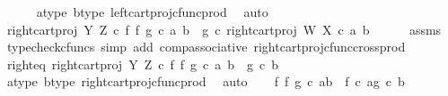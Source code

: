 \begin{isabellebody}
\ \ \ \ \isamarkupfalse%
\ a{\isacharunderscore}{\kern0pt}type\ b{\isacharunderscore}{\kern0pt}type\ left{\isacharunderscore}{\kern0pt}cart{\isacharunderscore}{\kern0pt}proj{\isacharunderscore}{\kern0pt}cfunc{\isacharunderscore}{\kern0pt}prod\ \isamarkupfalse%
\ auto\isanewline
\ \ \isanewline
\ \ \isamarkupfalse%
\ {\isachardoublequoteopen}right{\isacharunderscore}{\kern0pt}cart{\isacharunderscore}{\kern0pt}proj\ Y\ Z\ {\isasymcirc}\isactrlsub c\ {\isacharparenleft}{\kern0pt}f\ {\isasymtimes}\isactrlsub f\ g{\isacharparenright}{\kern0pt}\ {\isasymcirc}\isactrlsub c\ {\isasymlangle}a{\isacharcomma}{\kern0pt}\ b{\isasymrangle}\ {\isacharequal}{\kern0pt}\ g\ {\isasymcirc}\isactrlsub c\ right{\isacharunderscore}{\kern0pt}cart{\isacharunderscore}{\kern0pt}proj\ W\ X\ {\isasymcirc}\isactrlsub c\ {\isasymlangle}a{\isacharcomma}{\kern0pt}\ b{\isasymrangle}{\isachardoublequoteclose}\isanewline
\ \ \ \ \isamarkupfalse%
\ assms\ \isamarkupfalse%
\ {\isacharparenleft}{\kern0pt}typecheck{\isacharunderscore}{\kern0pt}cfuncs{\isacharcomma}{\kern0pt}\ simp\ add{\isacharcolon}{\kern0pt}\ comp{\isacharunderscore}{\kern0pt}associative{}\ right{\isacharunderscore}{\kern0pt}cart{\isacharunderscore}{\kern0pt}proj{\isacharunderscore}{\kern0pt}cfunc{\isacharunderscore}{\kern0pt}cross{\isacharunderscore}{\kern0pt}prod{\isacharparenright}{\kern0pt}\isanewline
\ \ \isamarkupfalse%
\ \isamarkupfalse%
\ right{\isacharunderscore}{\kern0pt}eq{\isacharcolon}{\kern0pt}\ {\isachardoublequoteopen}right{\isacharunderscore}{\kern0pt}cart{\isacharunderscore}{\kern0pt}proj\ Y\ Z\ {\isasymcirc}\isactrlsub c\ {\isacharparenleft}{\kern0pt}f\ {\isasymtimes}\isactrlsub f\ g{\isacharparenright}{\kern0pt}\ {\isasymcirc}\isactrlsub c\ {\isasymlangle}a{\isacharcomma}{\kern0pt}\ b{\isasymrangle}\ {\isacharequal}{\kern0pt}\ g\ {\isasymcirc}\isactrlsub c\ b{\isachardoublequoteclose}\isanewline
\ \ \ \ \isamarkupfalse%
\ a{\isacharunderscore}{\kern0pt}type\ b{\isacharunderscore}{\kern0pt}type\ right{\isacharunderscore}{\kern0pt}cart{\isacharunderscore}{\kern0pt}proj{\isacharunderscore}{\kern0pt}cfunc{\isacharunderscore}{\kern0pt}prod\ \isamarkupfalse%
\ auto\isanewline
\isanewline
\ \ \isamarkupfalse%
\ {\isachardoublequoteopen}{\isacharparenleft}{\kern0pt}f\ {\isasymtimes}\isactrlsub f\ g{\isacharparenright}{\kern0pt}\ {\isasymcirc}\isactrlsub c\ {\isasymlangle}a{\isacharcomma}{\kern0pt}b{\isasymrangle}\ {\isacharequal}{\kern0pt}\ {\isasymlangle}f\ {\isasymcirc}\isactrlsub c\ a{\isacharcomma}{\kern0pt}g\ {\isasymcirc}\isactrlsub c\ b{\isasymrangle}{\isachardoublequoteclose}\isanewline

\end{isabellebody}
